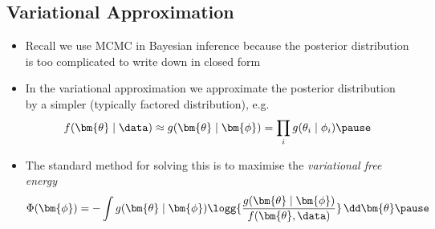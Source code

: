 \begin{slide}
\section{Variational Approximation}

\begin{PauseHighLight}
  \begin{itemize}
  \item Recall we use MCMC in Bayesian inference because the posterior
    distribution is too complicated to write down in closed form\pause
  \item In the variational approximation we approximate the posterior
    distribution by a simpler (typically factored distribution), e.g.
    \begin{align*}
      f(\bm{\theta}\mid\data) \approx g(\bm{\theta}\mid\bm{\phi}) = \prod_i
      g(\theta_i\mid\phi_i)\pause
    \end{align*}
  \item The standard method for solving this is to maximise the
    \emph{variational free energy}
    \begin{align*}
      \Phi(\bm{\phi}) = -\int g(\bm{\theta}\mid\bm{\phi})
      \logg{\frac{g(\bm{\theta}\mid\bm{\phi})}{f(\bm{\theta}, \data)}} \,
      \dd \bm{\theta}\pause
    \end{align*}
  \end{itemize}
\end{PauseHighLight}

\end{slide}


